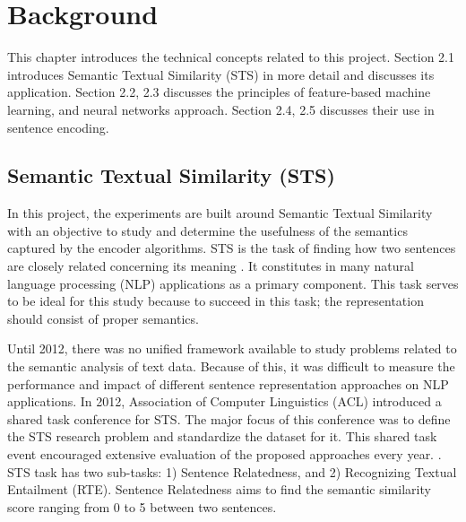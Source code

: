 \documentclass[12pt]{report} %
\begin{document}
	

\chapter{Background}
This chapter introduces the technical concepts related to this project. Section 2.1 introduces Semantic Textual Similarity (STS) in
more detail and discusses its application. Section 2.2, 2.3 discusses the
principles of feature-based machine learning, and neural networks approach. Section 2.4, 2.5 discusses their use in sentence encoding.


\section{Semantic Textual Similarity (STS)}

    In this project, the experiments are built around Semantic Textual Similarity with an objective to study and determine the usefulness of the semantics captured by the encoder algorithms. STS is the task of finding how two sentences are closely related concerning its meaning \citep{agirre2012semeval}. It constitutes in many natural language processing (NLP) applications as a primary component. This task serves to be ideal for this study because to succeed in this task; the representation should consist of proper semantics. 
    
    Until 2012, there was no unified framework available to study problems related to the semantic analysis of text data. Because of this, it was difficult to measure the performance and impact of different sentence representation approaches on NLP applications. In 2012, Association of Computer Linguistics (ACL) introduced a shared task conference for STS. The major focus of this conference was to define the STS research problem and standardize the dataset for it. This shared task event encouraged extensive evaluation of the proposed approaches every year. \citep{agirre2012semeval}. STS task has two sub-tasks: 1) Sentence Relatedness, and 2) Recognizing Textual Entailment (RTE). Sentence Relatedness aims to find the semantic similarity score ranging from 0 to 5 between two sentences. 
    
\end{document}
